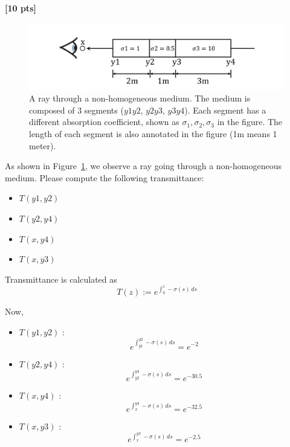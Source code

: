 \documentclass[11pt,addpoints,answers]{exam}
\begin{document}
\begin{questions}
\question \textbf{[10 pts]}
\begin{figure}[h]
    \centering
    \includegraphics[width=\textwidth]{figure1.png}
    \caption{A ray through a non-homogeneous medium. The medium is composed of 3 segments ($y1y2$, $y2y3$, $y3y4$). Each segment has a different absorption coefficient, shown as $\sigma_1, \sigma_2, \sigma_3$ in the figure. The length of each segment is also annotated in the figure (1m means 1 meter).}
    \label{fig:q1}
\end{figure}

As shown in Figure~\ref{fig:q1}, we observe a ray going through a non-homogeneous medium. 
Please compute the following transmittance:
\begin{itemize}
    \item $T(y1, y2)$
    \item  $T(y2, y4)$
    \item $T(x, y4)$
    \item $T(x, y3)$
\end{itemize} 



\begin{tcolorbox}[fit,height=20cm, width=\textwidth, blank, borderline={0.5pt}{-2pt},halign=left, valign=center, nobeforeafter]


\begin{studentsolution}
Transmittance is calculated as 
\[
    T(z) := e^{\int_0^z -\sigma(s)\, ds}
\]

Now,
\begin{itemize}
    \item $T(y1, y2)$ : \[
        e^{\int_{y1}^{y2} -\sigma(s)\, ds} = e^{-2}
    \]
    \item $T(y2, y4)$ : \[
        e^{\int_{y2}^{y4} -\sigma(s)\, ds} = e^{-30.5}
    \]
    \item $T(x, y4)$ : \[
        e^{\int_{x}^{y4} -\sigma(s)\, ds} = e^{-32.5}
    \]
    \item $T(x, y3)$ : \[
        e^{\int_{x}^{y3} -\sigma(s)\, ds} = e^{-2.5}
    \]
    
\end{itemize}
\end{studentsolution}

\end{tcolorbox}
\end{questions}
\end{document}

